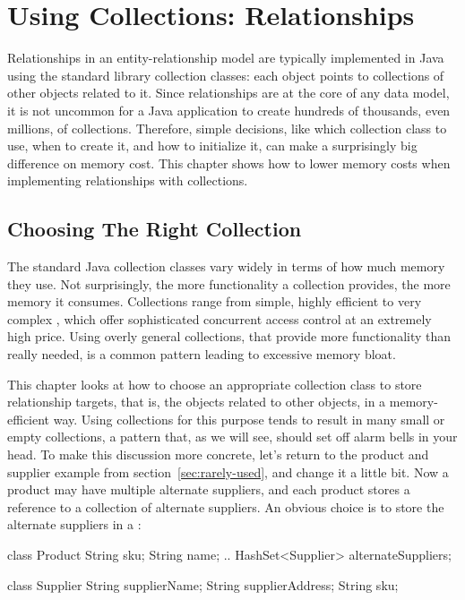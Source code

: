 \chapter{Using Collections: Relationships}

Relationships in an
entity-relationship model are typically implemented in Java using the
standard library collection classes:
each object points to collections of other objects related to it.
Since relationships are at the core of any data model, it
 is not uncommon for a Java application to create hundreds of
thousands, even millions, of collections. Therefore, simple decisions, like
which collection class to use, when to create it, and how to initialize it,
can make a surprisingly big difference on memory cost.
This chapter shows
 how to lower memory costs when implementing relationships with collections.
 
 \section{Choosing The Right Collection}

The standard Java collection classes vary widely in terms of how much memory they use.
Not surprisingly, the more functionality a collection provides, the more
memory it consumes. Collections range from simple, highly efficient
 to very complex
, which offer sophisticated concurrent access
control at an extremely high price. 
Using overly general collections, that provide more functionality than
really needed, is a common pattern leading to excessive memory bloat.

This chapter looks at how to choose an appropriate collection class to
store relationship targets, that is, the objects related to other
objects, in a memory-efficient way. Using collections for this purpose tends to result in many small or empty collections, a pattern that,
as we will see, should set off alarm bells in your head. 
To make this discussion more concrete, let's return to the product and supplier example 
from section~\ref{sec:rarely-used}, and change it a little
 bit. Now a product may have multiple alternate suppliers, and each product
 stores a reference to a collection of alternate suppliers. An obvious choice is
 to store the alternate suppliers in a :
 \begin{shortlisting} 
class Product {
	String sku;
	String name;
	.. 
	HashSet<Supplier> alternateSuppliers;
}

class Supplier {
	String supplierName;
	String supplierAddress;
	String sku;
}
\end{shortlisting}
 





